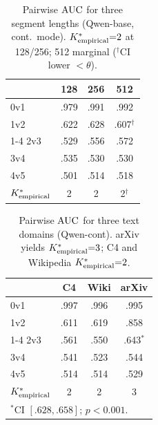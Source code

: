 \begin{table}[t]
  \centering
  \small
  \caption{Pairwise $\text{AUC}$ for three segment lengths (Qwen-base, cont.\ mode). ${K^*_{\text{empirical}}}{=}2$ at 128/256; 512 marginal ($^\dagger$CI lower $< \theta$).}
  \label{tab:s11_length_ablation}
  \begin{tabular}{lccc}
    \toprule
    & \textbf{128} & \textbf{256} & \textbf{512} \\
    \midrule
    0v1 & .979 & .991 & .992 \\
    1v2 & .622 & .628 & .607$^\dagger$ \\
    \cmidrule(lr){1-4}
    2v3 & .529 & .556 & .572 \\
    3v4 & .535 & .530 & .530 \\
    4v5 & .501 & .514 & .518 \\
    \midrule
    ${K^*_{\text{empirical}}}$ & 2 & 2 & 2$^\dagger$ \\
    \bottomrule
  \end{tabular}
\end{table}

\begin{table}[t]
  \centering
  \small
  \caption{Pairwise $\text{AUC}$ for three text domains (Qwen-cont). arXiv yields ${K^*_{\text{empirical}}}{=}3$; C4 and Wikipedia ${K^*_{\text{empirical}}}{=}2$.}
  \label{tab:s12_domain_ablation}
  \begin{tabular}{lccc}
    \toprule
    & \textbf{C4} & \textbf{Wiki} & \textbf{arXiv} \\
    \midrule
    0v1 & .997 & .996 & .995 \\
    1v2 & .611 & .619 & .858 \\
    \cmidrule(lr){1-4}
    2v3 & .561 & .550 & .643$^*$ \\
    3v4 & .541 & .523 & .544 \\
    4v5 & .514 & .514 & .529 \\
    \midrule
    ${K^*_{\text{empirical}}}$ & 2 & 2 & 3 \\
    \bottomrule
    \multicolumn{4}{l}{\footnotesize $^*$CI $[.628,.658]$; $p < 0.001$.}
  \end{tabular}
\end{table}

